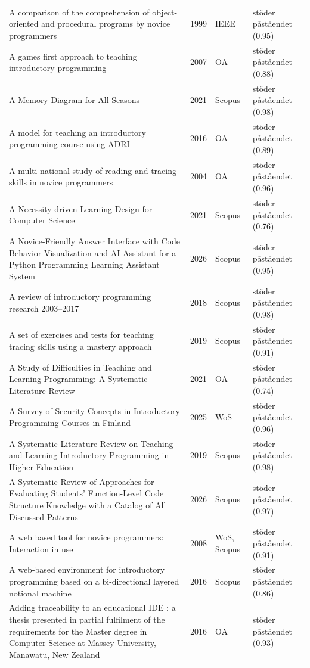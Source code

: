 \begin{longtable}{@{}%
  >{\raggedright\arraybackslash}p{}c%
  >{\raggedright\arraybackslash}p{}%
  >{\raggedright\arraybackslash}p{}@{}}
A comparison of the comprehension of object-oriented and procedural programs by novice programmers & 1999 & IEEE & stöder påståendet (0.95) \\
A games first approach to teaching introductory programming & 2007 & OA & stöder påståendet (0.88) \\
A Memory Diagram for All Seasons & 2021 & Scopus & stöder påståendet (0.98) \\
A model for teaching an introductory programming course using ADRI & 2016 & OA & stöder påståendet (0.89) \\
A multi-national study of reading and tracing skills in novice programmers & 2004 & OA & stöder påståendet (0.96) \\
A Necessity-driven Learning Design for Computer Science & 2021 & Scopus & stöder påståendet (0.76) \\
A Novice-Friendly Answer Interface with Code Behavior Visualization and AI Assistant for a Python Programming Learning Assistant System & 2026 & Scopus & stöder påståendet (0.95) \\
A review of introductory programming research 2003--2017 & 2018 & Scopus & stöder påståendet (0.98) \\
A set of exercises and tests for teaching tracing skills using a mastery approach & 2019 & Scopus & stöder påståendet (0.91) \\
A Study of Difficulties in Teaching and Learning Programming: A Systematic Literature Review & 2021 & OA & stöder påståendet (0.74) \\
A Survey of Security Concepts in Introductory Programming Courses in Finland & 2025 & WoS & stöder påståendet (0.96) \\
A Systematic Literature Review on Teaching and Learning Introductory Programming in Higher Education & 2019 & Scopus & stöder påståendet (0.98) \\
A Systematic Review of Approaches for Evaluating Students' Function-Level Code Structure Knowledge with a Catalog of All Discussed Patterns & 2026 & Scopus & stöder påståendet (0.97) \\
A web based tool for novice programmers: Interaction in use & 2008 & WoS, Scopus & stöder påståendet (0.91) \\
A web-based environment for introductory programming based on a bi-directional layered notional machine & 2016 & Scopus & stöder påståendet (0.86) \\
Adding traceability to an educational IDE : a thesis presented in partial fulfilment of the requirements for the Master degree in Computer Science at Massey University, Manawatu, New Zealand & 2016 & OA & stöder påståendet (0.93) \\

\end{longtable}
